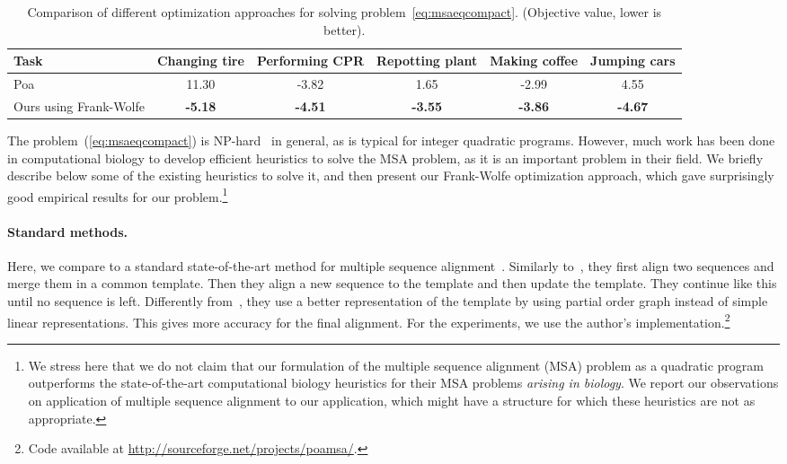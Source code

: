 \documentclass[10pt,twocolumn,letterpaper]{article}
\begin{document}
\begin{table*}[!ht] 
    \centering
    \setlength{\tabcolsep}{.6em} 
    \begin{tabular}{lccccc} 
        \toprule
        Task 			&  Changing tire   &  Performing CPR  & Repotting plant &  Making coffee   & Jumping cars\\ 
        \midrule
Poa~\cite{Lee01poa} 			    &   11.30   &   -3.82   &  1.65    &   -2.99   &   4.55	\\ 
        Ours using Frank-Wolfe 					    &  \textbf{-5.18}  &   \textbf{-4.51}   & \textbf{-3.55} &   \textbf{-3.86}   & \textbf{-4.67} 	\\ 
        \bottomrule
    \end{tabular}  
\caption{Comparison of different optimization approaches for solving problem~\eqref{eq:msaeqcompact}. (Objective value, lower is better).}  
    \label{tab:msaObj}
\end{table*} 

The problem~(\ref{eq:msaeqcompact}) is NP-hard~\cite{wang1994msaNPhard} in general, as is typical 
for integer quadratic programs.
However, much work has been done in computational biology
to develop efficient heuristics to solve the MSA problem,
as it is an important problem in their field.
We briefly describe below some of the existing heuristics to solve it,
and then present our Frank-Wolfe optimization approach,
which gave surprisingly good empirical results
for our problem.\footnote{We stress here that we do not claim 
that our formulation of the multiple sequence alignment (MSA) problem as a quadratic program outperforms the state-of-the-art 
computational biology heuristics for their MSA problems \emph{arising in biology}.
We report our observations on application of multiple sequence alignment to our application,
which might have a structure for which these heuristics are not as appropriate.}


\paragraph{Standard methods.}
Here, we compare to a standard state-of-the-art method for multiple sequence alignment~\cite{Lee01poa}.
Similarly to~\cite{Higgins88clustal}, they first align two sequences and merge them in a common template.
Then they align a new sequence to the template and then update the template.
They continue like this until no sequence is left.
Differently from~\cite{Higgins88clustal}, they use a better representation of the template by using partial order graph instead of simple linear representations.
This gives more accuracy for the final alignment.
For the experiments, we use the author's implementation.\footnote{Code available at \url{http://sourceforge.net/projects/poamsa/}.}
\end{document}
